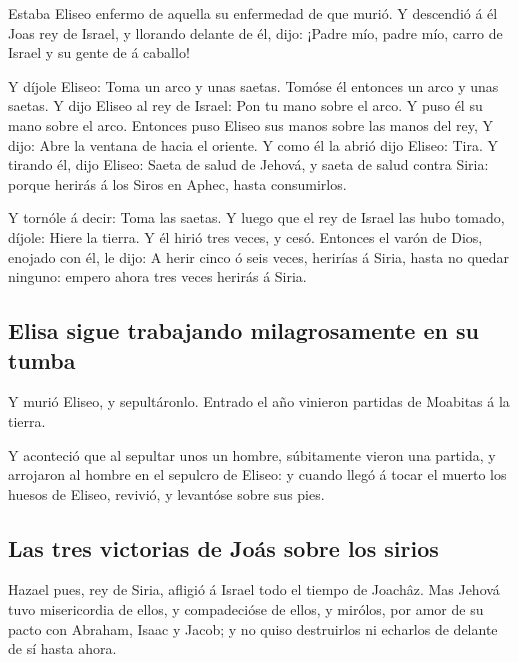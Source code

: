  Estaba Eliseo enfermo de aquella su enfermedad de que
murió. Y descendió á él Joas rey de Israel, y llorando delante de él,
dijo: ¡Padre mío, padre mío, carro de Israel y su gente de á caballo!

 Y díjole Eliseo: Toma un arco y unas saetas. Tomóse él
entonces un arco y unas saetas.  Y dijo Eliseo al rey de
Israel: Pon tu mano sobre el arco. Y puso él su mano sobre el arco.
Entonces puso Eliseo sus manos sobre las manos del rey,  Y
dijo: Abre la ventana de hacia el oriente. Y como él la abrió dijo
Eliseo: Tira. Y tirando él, dijo Eliseo: Saeta de salud de Jehová, y
saeta de salud contra Siria: porque herirás á los Siros en Aphec, hasta
consumirlos.

 Y tornóle á decir: Toma las saetas. Y luego que el rey de
Israel las hubo tomado, díjole: Hiere la tierra. Y él hirió tres veces,
y cesó.  Entonces el varón de Dios, enojado con él, le
dijo: A herir cinco ó seis veces, herirías á Siria, hasta no quedar
ninguno: empero ahora tres veces herirás á Siria.

\hypertarget{elisa-sigue-trabajando-milagrosamente-en-su-tumba}{%
\subsection{Elisa sigue trabajando milagrosamente en su
tumba}\label{elisa-sigue-trabajando-milagrosamente-en-su-tumba}}

 Y murió Eliseo, y sepultáronlo. Entrado el año vinieron
partidas de Moabitas á la tierra.

 Y aconteció que al sepultar unos un hombre, súbitamente
vieron una partida, y arrojaron al hombre en el sepulcro de Eliseo: y
cuando llegó á tocar el muerto los huesos de Eliseo, revivió, y
levantóse sobre sus pies.

\hypertarget{las-tres-victorias-de-jouxe1s-sobre-los-sirios}{%
\subsection{Las tres victorias de Joás sobre los
sirios}\label{las-tres-victorias-de-jouxe1s-sobre-los-sirios}}

 Hazael pues, rey de Siria, afligió á Israel todo el tiempo
de Joachâz.  Mas Jehová tuvo misericordia de ellos, y
compadecióse de ellos, y mirólos, por amor de su pacto con Abraham,
Isaac y Jacob; y no quiso destruirlos ni echarlos de delante de sí hasta
ahora.

